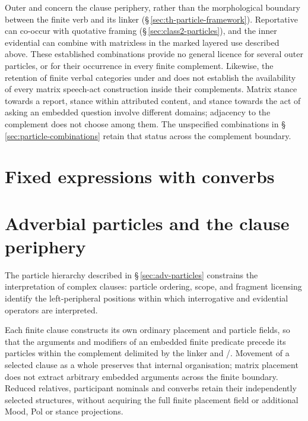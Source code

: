 Outer  and  concern the clause
periphery, rather than the morphological boundary between the finite verb
and its linker (§\,\ref{sec:th-particle-framework}). Reportative
 can co-occur with quotative framing
(§\,\ref{sec:class2-particles}), and the inner evidential can combine
with matrixless  in the marked layered use described above.
These established combinations provide no general licence for several
outer particles, or for their occurrence in every finite complement.
Likewise, the retention of finite verbal categories under  and
 does not establish the availability of every matrix
speech-act construction inside their complements. Matrix stance towards a
report, stance within attributed content, and stance towards the act of
asking an embedded question involve different domains; adjacency to the
complement does not choose among them. The unspecified combinations in
§\,\ref{sec:particle-combinations} retain that status across the
complement boundary.

\section{Fixed expressions with converbs}\label{sec:fixed-converbs}


\section{Adverbial particles and the clause periphery}
\label{sec:th-particle-integration}

The particle hierarchy described in §\,\ref{sec:adv-particles} constrains
the interpretation of complex clauses: particle ordering, scope, and fragment
licensing identify the left-peripheral positions within which interrogative and
evidential operators are interpreted.

Each finite clause constructs its own ordinary placement and particle fields,
so that the arguments and modifiers of an embedded finite predicate precede
its particles within the complement delimited by the linker and
/. Movement of a selected clause as a whole preserves that
internal organisation; matrix placement does not extract arbitrary embedded
arguments across the finite boundary. Reduced relatives, participant nominals
and converbs retain their independently selected structures, without acquiring
the full finite placement field or additional Mood, Pol or stance projections.

